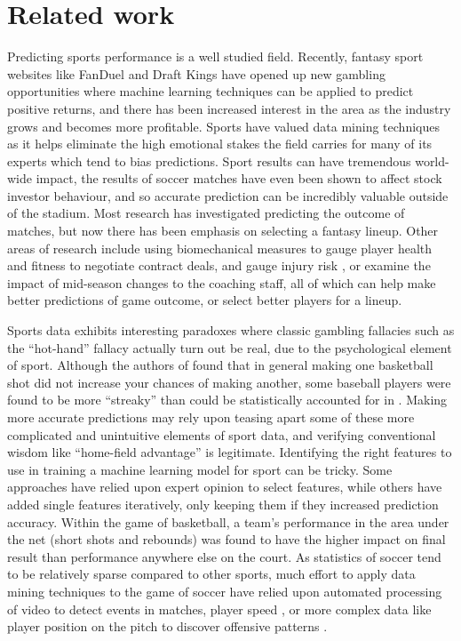 \documentclass[conference]{IEEEtran}
\begin{document}
\section{Related work}
Predicting sports performance is a well studied field. Recently, fantasy sport websites like FanDuel and Draft Kings have opened up new gambling opportunities where machine learning techniques can be applied to predict positive returns\cite{Sugar:aa}, and there has been increased interest in the area\cite{Bishop:2004aa} as the industry grows and becomes more profitable. Sports have valued data mining techniques as it helps eliminate the high emotional stakes the field carries for many of its experts which tend to bias predictions\cite{Haghighat:2013aa}. Sport results can have tremendous world-wide impact, the results of soccer matches have even been shown to affect stock investor behaviour\cite{Edmans:2007aa}, and so accurate prediction can be incredibly valuable outside of the stadium. Most research has investigated predicting the outcome of matches, but now there has been emphasis on selecting a fantasy lineup. Other areas of research include using biomechanical measures to gauge player health and fitness to negotiate contract deals\cite{Davenport:2010aa}, and gauge injury risk \cite{Carling:2012aa,Owen:2015aa}, or examine the impact of mid-season changes to the coaching staff\cite{coach}, all of which can help make better predictions of game outcome, or select better players for a lineup.

Sports data exhibits interesting paradoxes where classic gambling fallacies such as the ``hot-hand'' fallacy actually turn out be real, due to the psychological element of sport. Although the authors of \cite{Gilovich:1985aa} found that in general making one basketball shot did not increase your chances of making another, some baseball players were found to be more ``streaky'' than could be statistically accounted for in \cite{Albert:2008aa}. Making more accurate predictions may rely upon teasing apart some of these more complicated and unintuitive elements of sport data, and verifying conventional wisdom like ``home-field advantage'' is legitimate\cite{textbook}. Identifying the right features to use in training a machine learning model for sport can be tricky. Some approaches have relied upon expert opinion to select features\cite{Zdravevski:2010aa}, while others have added single features iteratively, only keeping them if they increased prediction accuracy\cite{Buursma:2011aa}. Within the game of basketball, a team's performance in the area under the net (short shots and rebounds) was found to have the higher impact on final result than performance anywhere else on the court\cite{Ivankovic:2010aa}. As statistics of soccer tend to be relatively sparse compared to other sports, much effort to apply data mining techniques to the game of soccer have relied upon automated processing of video to detect events in matches\cite{Sykora2015,goal_detection}, player speed \cite{Redwood-Brown:2012aa}, or more complex data like player position on the pitch to discover offensive patterns \cite{offence_patterns}. 
\end{document}
